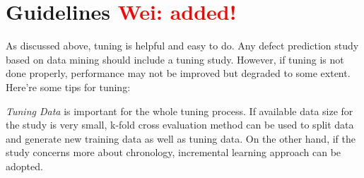 \documentclass{sig-alternative}
\newcommand{\wei}[1]{\textcolor{red}{Wei: #1}}
\begin{document}



\section{Guidelines \wei{added!}}

As discussed above, tuning is helpful and easy to do. Any defect prediction study based on data mining should include a tuning study. However, if tuning is not done properly, performance may not be improved but degraded to some extent. Here're some tips for tuning:

{\em Tuning Data} is important for the whole tuning process. If available data size for the study is very small, k-fold cross evaluation method can be used to split data and generate new training data as well as tuning data. On the other hand, if the study concerns more about chronology, incremental learning approach can be adopted. 
\end{document}
